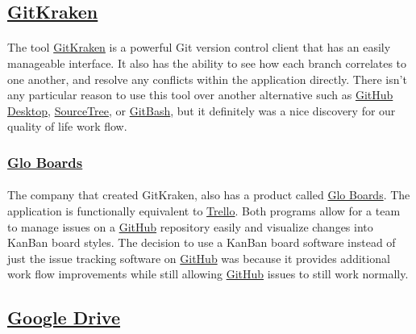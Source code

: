 \documentclass[12pt]{article}
\begin{document}
\subsection{\href{https://www.gitkraken.com/}{GitKraken}}
\paragraph{}	The tool \href{https://www.gitkraken.com/}{GitKraken} is a powerful Git version control client that has an easily manageable interface. It also has the ability to see how each branch correlates to one another, and resolve any conflicts within the application directly. There isn't any particular reason to use this tool over another alternative such as \href{https://desktop.github.com/}{GitHub Desktop}, \href{https://www.sourcetreeapp.com/}{SourceTree}, or \href{https://gitforwindows.org/}{GitBash}, but it definitely was a nice discovery for our quality of life work flow. 

\subsubsection{\href{https://www.gitkraken.com/glo}{Glo Boards}}
\paragraph{} The company that created GitKraken, also has a product called \href{https://www.gitkraken.com/glo}{Glo Boards}. The application is functionally equivalent to \href{https://trello.com/en}{Trello}. Both programs allow for a team to manage issues on a \href{https://github.com}{GitHub} repository easily and visualize changes into KanBan board styles. The decision to use a KanBan board software instead of just the issue tracking software on \href{https://github.com}{GitHub} was because it provides additional work flow improvements while still allowing \href{https://github.com}{GitHub} issues to still work normally.

\subsection{\href{https://drive.google.com}{Google Drive}}
\end{document}
